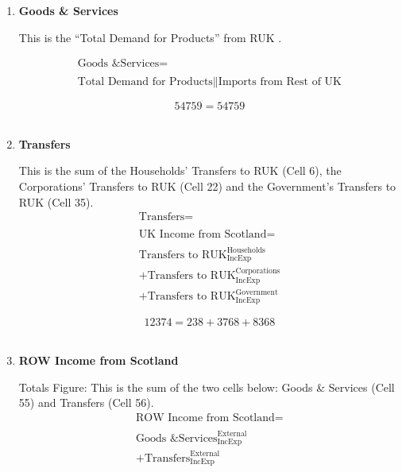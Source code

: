 \begin{enumerate}
\item \textbf {Goods \& Services}

This is the “Total Demand for Products” from RUK \cite{ScotGov2013a}.

\begin{equation}
\begin{split}
\text{Goods \& Services} =  \\ \\
\text{Total Demand for Products}\|\text{Imports from Rest of UK}
\end{split} \label{eq:2.5.56}
\end{equation}

\begin{equation} \nonumber
54759 = 54759
\end{equation}\\


\item \textbf {Transfers}

This is the sum of the Households' Transfers to RUK (Cell 6), the Corporations' Transfers to RUK (Cell 22) and the Government's Transfers to RUK (Cell 35).\\

\begin{equation}
\begin{split}
\text{Transfers} =  \\ \\
\text{UK Income from Scotland} =  \\ \\
\text{Transfers to RUK}^\text{Households}_\text{IncExp}\\
+\text{Transfers to RUK}^\text{Corporations}_\text{IncExp}\\
+\text{Transfers to RUK}^\text{Government}_\text{IncExp}
\end{split} \label{eq:2.5.57}
\end{equation}

\begin{equation} \nonumber
12374 = 238+3768+8368
\end{equation}\\


\item \textbf {ROW Income from Scotland}

Totals Figure: This is the sum of the two cells below: Goods \& Services (Cell 55) and Transfers (Cell 56).\\

\begin{equation}
\begin{split}
\text{ROW Income from Scotland} =  \\ \\
\text{Goods \& Services}^\text{External}_\text{IncExp}\\
+\text{Transfers}^\text{External}_\text{IncExp}
\end{split} \label{eq:2.5.58}
\end{equation}


\end{enumerate}
